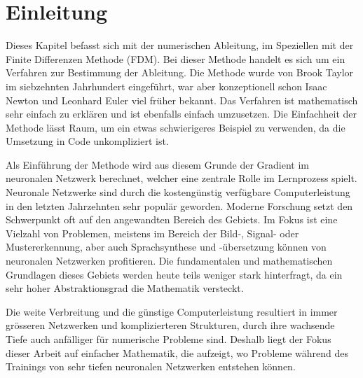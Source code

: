 %
%
%
\section{Einleitung\label{ableitung:section:einleitung}}
Dieses Kapitel befasst sich mit der numerischen Ableitung, im Speziellen mit der Finite Differenzen Methode (FDM).
%
Bei dieser Methode handelt es sich um ein Verfahren zur Bestimmung der Ableitung.
Die Methode wurde von Brook Taylor im siebzehnten Jahrhundert eingeführt, war aber konzeptionell schon Isaac Newton und Leonhard Euler viel früher bekannt. 
%
%
%
Das Verfahren ist mathematisch sehr einfach zu erklären und ist ebenfalls einfach umzusetzen. Die Einfachheit der Methode lässt Raum, um ein etwas schwierigeres Beispiel zu verwenden, da die Umsetzung in Code unkompliziert ist.

Als Einführung der Methode wird aus diesem Grunde der Gradient im neuronalen Netzwerk berechnet, welcher eine zentrale Rolle im Lernprozess spielt.
%
%
Neuronale Netzwerke sind durch die kostengünstig verfügbare
Computerleistung in den letzten Jahrzehnten sehr populär geworden.
Moderne Forschung setzt den Schwerpunkt oft auf den angewandten
Bereich des Gebiets.
Im Fokus ist eine Vielzahl von Problemen, meistens im Bereich der
Bild-, Signal- oder Mustererkennung, aber auch Sprachsynthese und
-übersetzung können von neuronalen Netzwerken profitieren.
Die fundamentalen und mathematischen Grundlagen dieses Gebiets werden heute teils weniger stark hinterfragt, da ein sehr hoher Abstraktionsgrad die Mathematik versteckt.
%
%
%
%
%

Die weite Verbreitung und die günstige Computerleistung resultiert
in immer grösseren Netzwerken und komplizierteren Strukturen, durch
ihre wachsende Tiefe auch anfälliger für numerische Probleme sind.
Deshalb liegt der Fokus dieser Arbeit auf einfacher Mathematik, die
aufzeigt, wo Probleme während des Trainings von sehr tiefen neuronalen
Netzwerken entstehen können.
%
